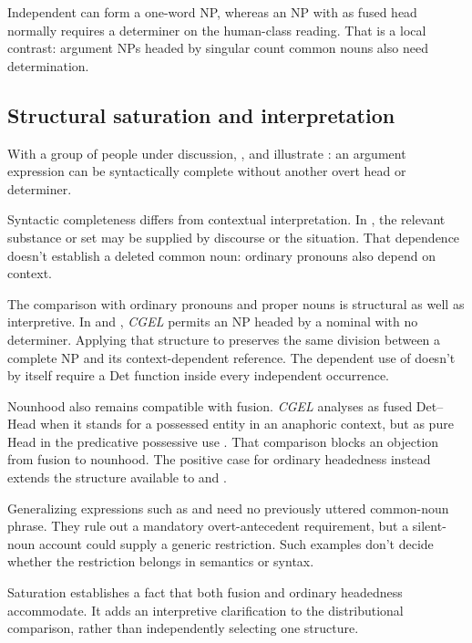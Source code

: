 \documentclass[12pt]{article}
\begin{document}
Independent  can form a one-word NP, whereas an NP with  as fused head normally requires a determiner on the human-class reading. That is a local contrast: argument NPs headed by singular count common nouns also need determination.

\subsection{Structural saturation and interpretation}

With a group of people under discussion, ,  and  illustrate : an argument expression can be syntactically complete without another overt head or determiner.

Syntactic completeness differs from contextual interpretation. In , the relevant substance or set may be supplied by discourse or the situation. That dependence doesn't establish a deleted common noun: ordinary pronouns also depend on context.

The comparison with ordinary pronouns and proper nouns is structural as well as interpretive. In  and , \textit{CGEL} permits an NP headed by a nominal with no determiner. Applying that structure to  preserves the same division between a complete NP and its context-dependent reference. The dependent use of  doesn't by itself require a Det function inside every independent occurrence.

Nounhood also remains compatible with fusion. \textit{CGEL} analyses  as fused Det--Head when it stands for a possessed entity in an anaphoric context, but as pure Head in the predicative possessive use  \citep[410--411]{huddleston2002}. That comparison blocks an objection from fusion to nounhood. The positive case for ordinary headedness instead extends the structure available to  and .

Generalizing expressions such as  and  need no previously uttered common-noun phrase. They rule out a mandatory overt-antecedent requirement, but a silent-noun account could supply a generic restriction. Such examples don't decide whether the restriction belongs in semantics or syntax.

Saturation establishes a fact that both fusion and ordinary headedness accommodate. It adds an interpretive clarification to the distributional comparison, rather than independently selecting one structure.
\end{document}
